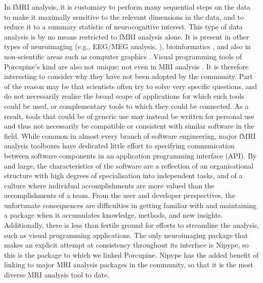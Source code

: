 In fMRI analysis, it is customary to perform many sequential steps on the data to make it maximally sensitive to the relevant dimensions in the data, and to reduce it to a summary statistic of neurocognitive interest. This type of data analysis is by no means restricted to fMRI analysis alone. It is present in other types of neuroimaging (e.g., EEG/MEG analysis, \cite{Oostenveld2011}), bioinformatics \cite{Wolstencroft2013}, and also in non-scientific areas such as computer graphics \cite{Blender}. Visual programming tools of Porcupine's kind are also not unique; not even in MRI analysis \cite{Lucas2010}. It is therefore interesting to consider why they have not been adopted by the community. Part of the reason may be that scientists often try to solve very specific questions, and do not necessarily realise the broad scope of applications for which such tools could be used, or complementary tools to which they could be connected. As a result, tools that could be of generic use may instead be written for personal use and thus not necessarily be compatible or consistent with similar software in the field. While common in almost every branch of software engineering, major fMRI analysis toolboxes have dedicated little effort to specifying communication between software components in an application programming interface (API). By and large, the characteristics of the software are a reflection of an organisational structure with high degrees of specialisation into independent tasks, and of a culture where individual accomplishments are more valued than the accomplishments of a team. From the user and developer perspectives, the unfortunate consequences are difficulties in getting familiar with and maintaining a package when it accumulates knowledge, methods, and new insights. Additionally, there is less than fertile ground for efforts to streamline the analysis, such as visual programming applications. The only neuroimaging package that makes an explicit attempt at consistency throughout its interface is Nipype, so this is the package to which we linked Porcupine. Nipype has the added benefit of linking to major MRI analysis packages in the community, so that it is the most diverse MRI analysis tool to date.

